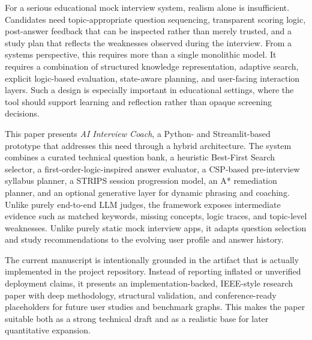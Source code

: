 \documentclass[conference]{IEEEtran}
\begin{document}
For a serious educational mock interview system, realism alone is insufficient. Candidates need topic-appropriate question sequencing, transparent scoring logic, post-answer feedback that can be inspected rather than merely trusted, and a study plan that reflects the weaknesses observed during the interview. From a systems perspective, this requires more than a single monolithic model. It requires a combination of structured knowledge representation, adaptive search, explicit logic-based evaluation, state-aware planning, and user-facing interaction layers. Such a design is especially important in educational settings, where the tool should support learning and reflection rather than opaque screening decisions.

This paper presents \textit{AI Interview Coach}, a Python- and Streamlit-based prototype that addresses this need through a hybrid architecture. The system combines a curated technical question bank, a heuristic Best-First Search selector, a first-order-logic-inspired answer evaluator, a CSP-based pre-interview syllabus planner, a STRIPS session progression model, an A* remediation planner, and an optional generative layer for dynamic phrasing and coaching. Unlike purely end-to-end LLM judges, the framework exposes intermediate evidence such as matched keywords, missing concepts, logic traces, and topic-level weaknesses. Unlike purely static mock interview apps, it adapts question selection and study recommendations to the evolving user profile and answer history.

The current manuscript is intentionally grounded in the artifact that is actually implemented in the project repository. Instead of reporting inflated or unverified deployment claims, it presents an implementation-backed, IEEE-style research paper with deep methodology, structural validation, and conference-ready placeholders for future user studies and benchmark graphs. This makes the paper suitable both as a strong technical draft and as a realistic base for later quantitative expansion.
\end{document}
